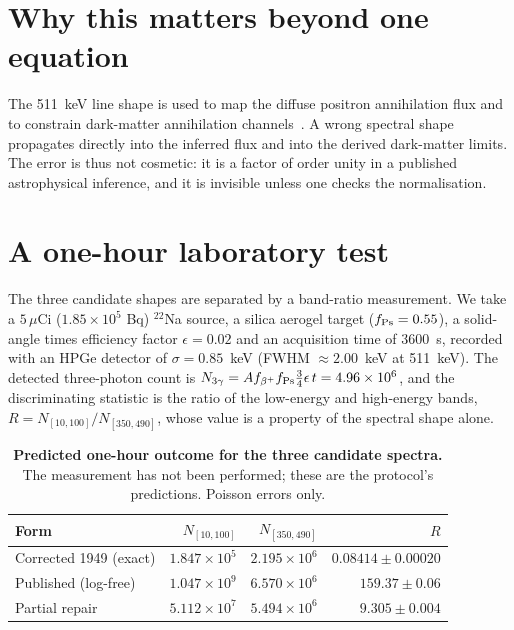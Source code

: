 \documentclass[twocolumn]{svjour3}
\begin{document}
\section{Why this matters beyond one equation}
The 511~keV line shape is used to map the diffuse positron
annihilation flux and to constrain dark-matter annihilation
channels~\cite{sy26,yoneda25}. A wrong spectral shape propagates
directly into the inferred flux and into the derived dark-matter
limits. The error is thus not cosmetic: it is a factor of order
unity in a published astrophysical inference, and it is invisible
unless one checks the normalisation.

\section{A one-hour laboratory test}
The three candidate shapes are separated by a band-ratio measurement.
We take a $5\,\mu$Ci ($1.85\times 10^{5}$ Bq) $^{22}$Na source,
a silica aerogel target ($f_{\rm Ps} = 0.55$), a solid-angle
times efficiency factor $\epsilon = 0.02$ and an acquisition time
of $3600$~s, recorded with an HPGe detector of
$\sigma = 0.85$~keV (FWHM $\approx 2.00$~keV at 511~keV). The
detected three-photon count is
$N_{3\gamma} = A f_{\beta^+} f_{\rm Ps} \tfrac{3}{4}\epsilon\,t = 4.96\times 10^{6}$,
and the discriminating statistic is the ratio of the low-energy and
high-energy bands,
$R = N_{[10,100]}/N_{[350,490]}$, whose value is a property of the
spectral shape alone.

\begin{table}[!htbp]
\centering\scriptsize
\setlength{\tabcolsep}{2pt}
\caption{\textbf{Predicted one-hour outcome for the three candidate spectra.}
The measurement has not been performed; these are the protocol's
predictions. Poisson errors only.}
\label{tab:na22}
\vspace{0.1cm}
\begin{tabular}{@{}lrrr@{}}
\toprule
Form & $N_{[10,100]}$ & $N_{[350,490]}$ & $R$ \\
\midrule
Corrected 1949 (exact) & $1.847\times 10^{5}$ & $2.195\times 10^{6}$ & $0.08414\pm 0.00020$ \\
Published (log-free) & $1.047\times 10^{9}$ & $6.570\times 10^{6}$ & $159.37\pm 0.06$ \\
Partial repair & $5.112\times 10^{7}$ & $5.494\times 10^{6}$ & $9.305\pm 0.004$ \\
\bottomrule
\end{tabular}
\end{table}
\end{document}
